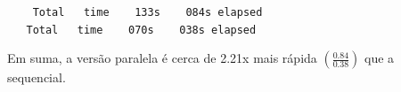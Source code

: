 \documentclass[a4paper]{article}
\begin{document}
\begin{tabbing}\tt
~~~Total~~~time~~~~133s~~~~084s~elapsed\\
\tt ~~~Total~~~time~~~~070s~~~~038s~elapsed
\end{tabbing}

  Em suma, a versão paralela é cerca de 2.21x mais rápida \ensuremath{(\frac{\mathrm{0.84}}{\mathrm{0.38}})}
que a sequencial.



\printindex

\end{document}
